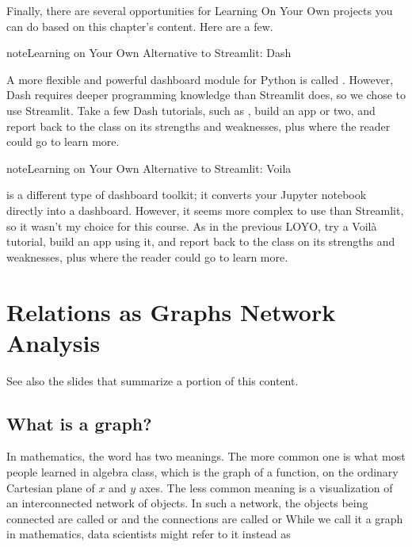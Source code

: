 \documentclass[letterpaper,10pt,english]{sphinxmanual}
\begin{document}
Finally, there are several opportunities for Learning On Your Own projects you can do based on this chapter’s content.  Here are a few.

\begin{sphinxadmonition}{note}{Learning on Your Own \sphinxhyphen{} Alternative to Streamlit: Dash}

A more flexible and powerful dashboard module for Python is called .  However, Dash requires deeper programming knowledge than Streamlit does, so we chose to use Streamlit.  Take a few Dash tutorials, such as , build an app or two, and report back to the class on its strengths and weaknesses, plus where the reader could go to learn more.
\end{sphinxadmonition}

\begin{sphinxadmonition}{note}{Learning on Your Own \sphinxhyphen{} Alternative to Streamlit: Voila}

 is a different type of dashboard toolkit; it converts your Jupyter notebook directly into a dashboard.  However, it seems more complex to use than Streamlit, so it wasn’t my choice for this course.  As in the previous LOYO, try a Voilà tutorial, build an app using it, and report back to the class on its strengths and weaknesses, plus where the reader could go to learn more.
\end{sphinxadmonition}


\chapter{Relations as Graphs \sphinxhyphen{} Network Analysis}
\label{\detokenize{chapter-15-networks:relations-as-graphs-network-analysis}}\label{\detokenize{chapter-15-networks::doc}}
See also the slides that summarize a portion of this content.


\section{What is a graph?}
\label{\detokenize{chapter-15-networks:what-is-a-graph}}
In mathematics, the word  has two meanings.  The more common one is what most people learned in algebra class, which is the graph of a function, on the ordinary Cartesian plane of \(x\) and \(y\) axes.  The less common meaning is a visualization of an interconnected network of objects.  In such a network, the objects being connected are called  or  and the connections are called   or   While we call it a graph in mathematics, data scientists might refer to it instead as 
\end{document}

